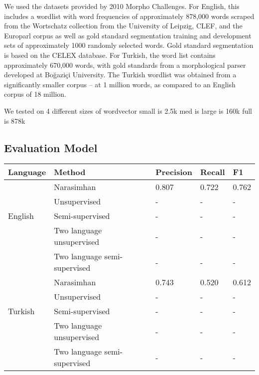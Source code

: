\documentclass[11pt,twocolumn]{article}
\begin{document}
We used the datasets provided by 2010 Morpho Challenges. For English, this includes
a wordlist with word frequencies of approximately 878,000 words scraped from the
Wortschatz collection from the University of Leipzig, CLEF, and the Europarl corpus
as well as gold standard segmentation training and development sets of approximately 
1000 randomly selected words. Gold standard segmentation is based on the CELEX database.
For Turkish, the word list contains approximately 670,000 words, with gold standards
from a morphological parser developed at Boğaziçi University. The Turkish wordlist
was obtained from a significantly smaller corpus -- at 1 million words, as compared
to an English corpus of 18 million.

We tested on 4 different sizes 
of wordvector 
small is 2.5k
med is 
large is 160k
full is 878k

\subsection{Evaluation Model}

\begin{center}
    \begin{tabular}{ | l | l | l | l | l |}
    \hline
    Language & Method & Precision & Recall & F1 \\ \hline
      & Narasimhan & 0.807 & 0.722 & 0.762 \\ 
    & Unsupervised & -  & - & - \\ 
    English & Semi-supervised & - & - & - \\ 
     & Two language unsupervised & - & - & - \\ 
     & Two language semi-supervised & - & - & - \\ \hline
     & Narasimhan & 0.743 & 0.520 & 0.612 \\ 
    & Unsupervised & - & - & - \\ 
    Turkish & Semi-supervised & - & - & -  \\ 
     & Two language unsupervised  & - & - & -  \\ 
     & Two language semi-supervised  & - & - & -  \\ \hline
    \end{tabular}
\end{center}
\end{document}
